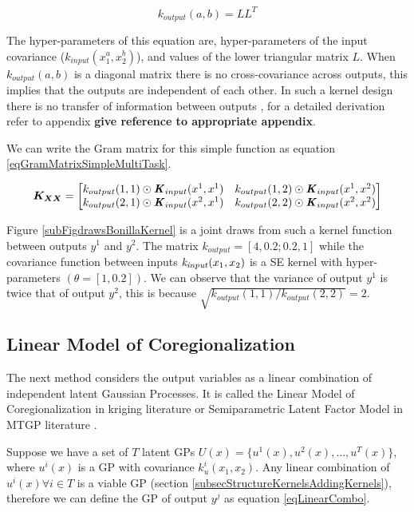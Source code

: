 \begin{equation}\label{eqKOutput}
k_{output}(a, b) = LL^T
\end{equation}

The hyper-parameters of this equation are, hyper-parameters of the input covariance ($k_{input}(x_{1}^{a}, x_{2}^{b})$), and values of the lower triangular matrix $L$. When $k_{output}(a, b)$ is a diagonal matrix there is no cross-covariance across outputs, this implies that the outputs are independent of each other. In such a kernel design there is no transfer of information between outputs \cite{bonilla2007multi, o1998markov}, for a detailed derivation refer to appendix \textbf{give reference to appropriate appendix}.

We can write the Gram matrix for this simple function as equation \ref{eqGramMatrixSimpleMultiTask}.

\begin{equation}\label{eqGramMatrixSimpleMultiTask}
   \boldsymbol{K_{XX}} =  \begin{bmatrix} k_{output}(1, 1) \odot \bm{\mathit{K}}_{input}(x^{1}, x^{1}) & 
k_{output}(1, 2) \odot \bm{\mathit{K}}_{input}(x^{1}, x^{2}) \\ 
k_{output}(2, 1) \odot \bm{\mathit{K}}_{input}(x^{2}, x^{1}) &
k_{output}(2, 2) \odot \bm{\mathit{K}}_{input}(x^{2}, x^{2}) 
\end{bmatrix}
\end{equation}

Figure \ref{subFigdrawsBonillaKernel} is a joint draws from such a kernel function between outputs $y^{1}$ and $y^{2}$. The matrix $k_{output} = [4, 0.2; 0.2, 1]$ while the covariance function between inputs $\mathit{k_{input}}(x_{1}, x_{2})$ is a SE kernel with hyper-parameters $(\theta = [1, 0.2])$. We can observe that the variance of output $y^{1}$ is twice that of output $y^{2}$, this is because $\sqrt{k_{output}(1, 1)/k_{output}(2, 2)} = 2$.

\subsection{Linear Model of Coregionalization}\label{subsecLMC}
The next method considers the output variables as a linear combination of independent latent Gaussian Processes. It is called the Linear Model of Coregionalization in kriging literature \cite{goovaerts1997geostatistics} or Semiparametric Latent Factor Model in MTGP literature \cite{seeger2005semiparametric}. 

Suppose we have a set of $T$ latent GPs $U(x) = \{u^{1}(x), u^2(x), \ldots, u^{T}(x)\}$, where $u^{i}(x)$ is a GP with covariance $k_{u}^{i}(x_{1}, x_{2})$. Any linear combination of $u^{i}(x) \forall i \in T$ is a viable GP (section \ref{subsecStructureKernelsAddingKernels}), therefore we can define the GP of output $y^{j}$ as equation \ref{eqLinearCombo}. 


